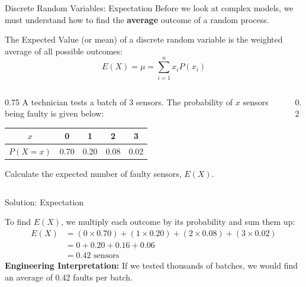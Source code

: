 \begin{frame}[allowframebreaks]{Discrete Random Variables: Expectation}
    Before we look at complex models, we must understand how to find the \textbf{average} outcome of a random process.
    
    \begin{definition}
        The Expected Value (or mean) of a discrete random variable is the weighted average of all possible outcomes:
        \[ E(X) = \mu = \sum_{i=1}^{n} x_i P(x_i) \]
    \end{definition}

    \begin{example}
        \begin{columns}[T, onlytextwidth]
            \begin{column}{0.75\textwidth}
                A technician tests a batch of 3 sensors. The probability of $x$ sensors being faulty is given below:
                \begin{center}
                \begin{tabular}{|c|c|c|c|c|}
                \hline
                $x$ & 0 & 1 & 2 & 3 \\ \hline
                $P(X=x)$ & 0.70 & 0.20 & 0.08 & 0.02 \\ \hline
                \end{tabular}
                \end{center}
                Calculate the expected number of faulty sensors, $E(X)$.
            \end{column}
            
            \begin{column}{0.2\textwidth}
            \end{column}
        \end{columns}
    \end{example}
\end{frame}

\begin{frame}{Solution: Expectation}
    \begin{solution}
        To find $E(X)$, we multiply each outcome by its probability and sum them up:
        \begin{align*}
            E(X) &= (0 \times 0.70) + (1 \times 0.20) + (2 \times 0.08) + (3 \times 0.02) \\
                 &= 0 + 0.20 + 0.16 + 0.06 \\
                 &= \mathbf{0.42} \text{ sensors}
        \end{align*}
        \textbf{Engineering Interpretation:} If we tested thousands of batches, we would find an average of 0.42 faults per batch.
    \end{solution}
\end{frame}

